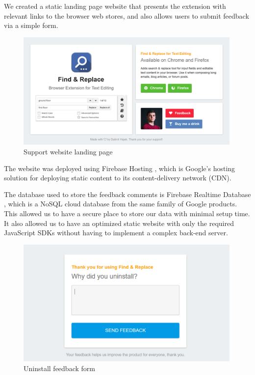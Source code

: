 \documentclass[bsc,frontabs,twoside,singlespacing,parskip,deptreport]{infthesis}
\begin{document}
We created a static landing page website that presents the extension with relevant links to the browser web stores, and also allows users to submit feedback via a simple form.

\begin{figure}[h]
\centering
\includegraphics[width=0.99\textwidth]{../graphics/landing-page.png}
\caption{Support website landing page}
\end{figure}

The website was deployed using Firebase Hosting \cite{A8}, which is Google's hosting solution for deploying static content to its content-delivery network (CDN).

The database used to store the feedback comments is Firebase Realtime Database \cite{A9}, which is a NoSQL cloud database from the same family of Google products. This allowed us to have a secure place to store our data with minimal setup time. It also allowed us to have an optimized static website with only the required JavaScript SDKs without having to implement a complex back-end server.

\begin{figure}[h]
\centering
\includegraphics[width=0.99\textwidth]{../docs/feedback-form.png}
\caption{Uninstall feedback form}
\end{figure}
\end{document}
